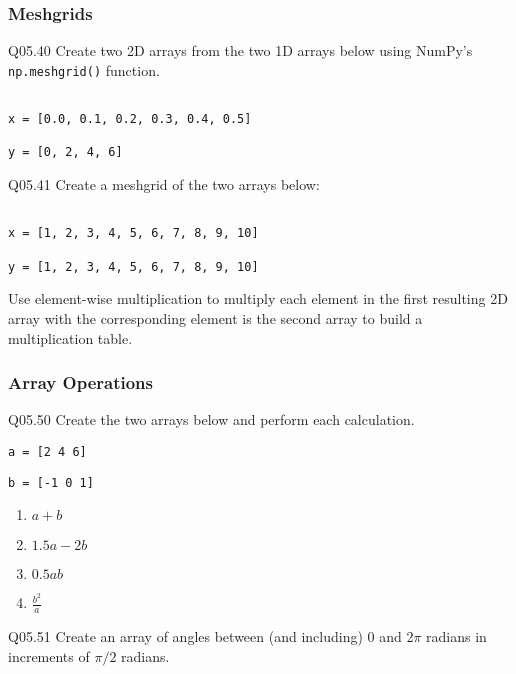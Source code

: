 \documentclass{book}
\newcommand{\passthrough}[1]{#1}
\begin{document}
    
        \hypertarget{meshgrids}{%
\subsubsection{Meshgrids}\label{meshgrids}}
    




    
        Q05.40 Create two 2D arrays from the two 1D arrays below using NumPy's
\passthrough{\lstinline!np.meshgrid()!} function.

\begin{lstlisting}

x = [0.0, 0.1, 0.2, 0.3, 0.4, 0.5]

y = [0, 2, 4, 6]
\end{lstlisting}

Q05.41 Create a meshgrid of the two arrays below:

\begin{lstlisting}

x = [1, 2, 3, 4, 5, 6, 7, 8, 9, 10]

y = [1, 2, 3, 4, 5, 6, 7, 8, 9, 10]
\end{lstlisting}

Use element-wise multiplication to multiply each element in the first
resulting 2D array with the corresponding element is the second array to
build a multiplication table.
    




    
        \hypertarget{array-operations}{%
\subsubsection{Array Operations}\label{array-operations}}

Q05.50 Create the two arrays below and perform each calculation.

\passthrough{\lstinline!a = [2 4 6]!}

\passthrough{\lstinline!b = [-1 0 1]!}

\begin{enumerate}
\def\labelenumi{(\alph{enumi})}
\item
  \(a + b\)
\item
  \(1.5a -2b\)
\item
  \(0.5ab\)
\item
  \(\frac{b^2}{a}\)
\end{enumerate}

Q05.51 Create an array of angles between (and including) 0 and 2\(\pi\)
radians in increments of \(\pi/2\) radians.
\end{document}
